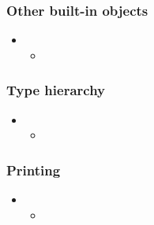\begin{frame}[fragile]
%
  \frametitle{Other built-in objects}
%
  \begin{itemize}
%
  \item 
    \begin{itemize}
    \item
    \end{itemize}
%
  \end{itemize}
%
\end{frame}

\begin{frame}[fragile]
%
  \frametitle{Type hierarchy}
%
  \begin{itemize}
%
  \item 
    \begin{itemize}
    \item
    \end{itemize}
%
  \end{itemize}
%
\end{frame}

\begin{frame}[fragile]
%
  \frametitle{Printing}
%
  \begin{itemize}
%
  \item 
    \begin{itemize}
    \item
    \end{itemize}
%
  \end{itemize}
%
\end{frame}

